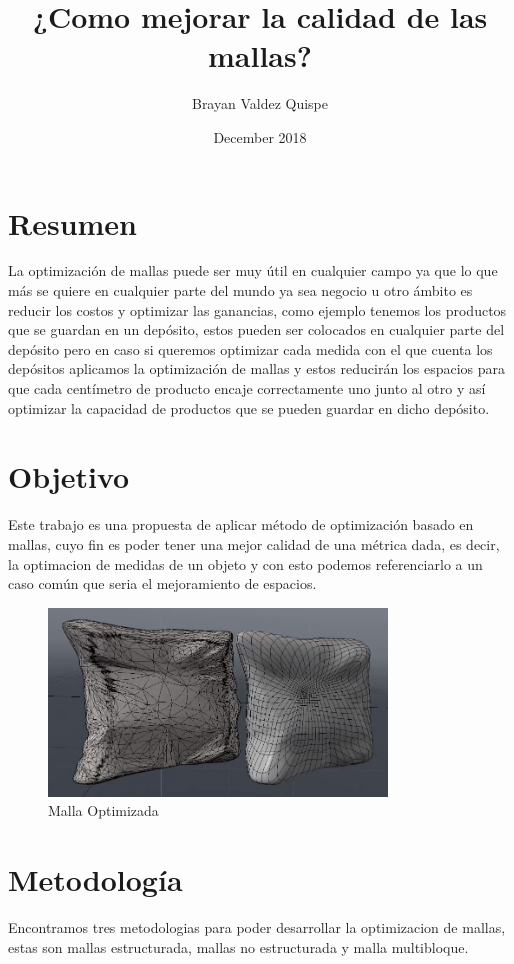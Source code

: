 \documentclass{article}
\title{¿Como mejorar la calidad de las mallas?}
\author{Brayan Valdez Quispe}
\date{December 2018}
\begin{document}
\maketitle

\section{Resumen}
La optimización de mallas puede ser muy útil en cualquier campo ya que lo que más se quiere en cualquier parte del mundo ya sea negocio u otro ámbito es reducir los costos y optimizar las ganancias, como ejemplo tenemos los productos que se guardan en un depósito, estos pueden ser colocados en cualquier parte del depósito pero en caso si queremos optimizar cada medida con el que cuenta los depósitos aplicamos la optimización de mallas y estos reducirán los espacios para que cada centímetro de producto encaje correctamente uno junto al otro y así optimizar la capacidad de productos que se pueden guardar en dicho depósito. \cite{alejandro2000metodos,juan2013optimizacion}

\section{Objetivo}
Este trabajo es una propuesta de aplicar método de optimización basado en mallas, cuyo fin es poder tener una mejor calidad de una métrica dada, es decir, la optimacion de medidas de un objeto y con esto podemos referenciarlo a un caso común que seria el mejoramiento de espacios. \cite{alejandro2000metodos}

\begin{figure}[h!]
\centering
\includegraphics[width=9cm]{MallaOptimizada}
\caption{Malla Optimizada}
\label{fig:Malla Optimizada}
\end{figure}

\section{Metodología}
Encontramos tres metodologias para poder desarrollar la optimizacion de mallas, estas son mallas estructurada, mallas no estructurada y malla multibloque. \cite{alejandro2000metodos,martinez1991optimizacion}
\end{document}
